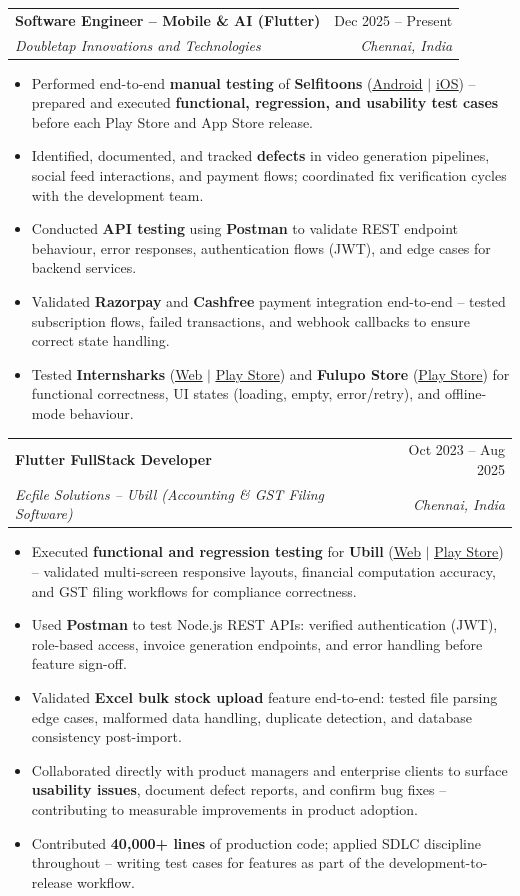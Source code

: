 \documentclass[letterpaper,10pt]{article}
\makeatletter
\newcommand{\resumeItem}[1]{
  \item\small{
    {#1 \vspace{-2pt}}
  }
}
\newcommand{\resumeSubheading}[4]{
  \vspace{-2pt}\item
    \begin{tabular*}{0.97\textwidth}[t]{l@{\extracolsep{\fill}}r}
      \textbf{#1} & #2 \\
      \textit{\small#3} & \textit{\small #4} \\
    \end{tabular*}\vspace{-7pt}
}
\newcommand{\resumeItemListStart}{\begin{itemize}}
\newcommand{\resumeItemListEnd}{\end{itemize}\vspace{-5pt}}
\makeatother
\begin{document}
    \resumeSubheading
      {Software Engineer -- Mobile \& AI (Flutter)}{Dec 2025 -- Present}
      {Doubletap Innovations and Technologies}{Chennai, India}
      \resumeItemListStart
        \resumeItem{Performed end-to-end \textbf{manual testing} of \textbf{Selfitoons} (\href{https://play.google.com/store/apps/details?id=com.doubletap.ai.selfitoons}{\underline{Android}} $|$ \href{https://apps.apple.com/in/app/selfitoons/id6758597947}{\underline{iOS}}) -- prepared and executed \textbf{functional, regression, and usability test cases} before each Play Store and App Store release.}
        \resumeItem{Identified, documented, and tracked \textbf{defects} in video generation pipelines, social feed interactions, and payment flows; coordinated fix verification cycles with the development team.}
        \resumeItem{Conducted \textbf{API testing} using \textbf{Postman} to validate REST endpoint behaviour, error responses, authentication flows (JWT), and edge cases for backend services.}
        \resumeItem{Validated \textbf{Razorpay} and \textbf{Cashfree} payment integration end-to-end -- tested subscription flows, failed transactions, and webhook callbacks to ensure correct state handling.}
        \resumeItem{Tested \textbf{Internsharks} (\href{https://internsharks.ai/}{\underline{Web}} $|$ \href{https://play.google.com/store/apps/details?id=com.doubletap.internsharks.ai}{\underline{Play Store}}) and \textbf{Fulupo Store} (\href{https://play.google.com/store/apps/details?id=com.doubletap.fulupostore}{\underline{Play Store}}) for functional correctness, UI states (loading, empty, error/retry), and offline-mode behaviour.}
      \resumeItemListEnd

    \resumeSubheading
      {Flutter FullStack Developer}{Oct 2023 -- Aug 2025}
      {Ecfile Solutions -- Ubill (Accounting \& GST Filing Software)}{Chennai, India}
      \resumeItemListStart
        \resumeItem{Executed \textbf{functional and regression testing} for \textbf{Ubill} (\href{https://app.ubill.tech/}{\underline{Web}} $|$ \href{https://play.google.com/store/apps/details?id=com.ubill.tech}{\underline{Play Store}}) -- validated multi-screen responsive layouts, financial computation accuracy, and GST filing workflows for compliance correctness.}
        \resumeItem{Used \textbf{Postman} to test Node.js REST APIs: verified authentication (JWT), role-based access, invoice generation endpoints, and error handling before feature sign-off.}
        \resumeItem{Validated \textbf{Excel bulk stock upload} feature end-to-end: tested file parsing edge cases, malformed data handling, duplicate detection, and database consistency post-import.}
        \resumeItem{Collaborated directly with product managers and enterprise clients to surface \textbf{usability issues}, document defect reports, and confirm bug fixes -- contributing to measurable improvements in product adoption.}
        \resumeItem{Contributed \textbf{40,000+ lines} of production code; applied SDLC discipline throughout -- writing test cases for features as part of the development-to-release workflow.}
      \resumeItemListEnd
\end{document}
